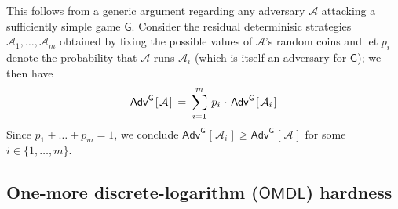 \documentclass{iacrtrans}
\begin{document}
\begin{rem}
\noindent
This follows from a generic argument
regarding any adversary $\mathcal{A}$
attacking a sufficiently simple game $\mathsf{G}$.
Consider the residual determinisic strategies
$\mathcal{A}_1, \dots, \mathcal{A}_m$ obtained
by fixing the possible values of $\mathcal{A}$'s
random coins and let $p_i$ denote the probability that
$\mathcal{A}$ runs $\mathcal{A}_i$
(which is itself an adversary for $\mathsf{G}$);
we then have
\vspace{5pt}
\begin{equation*}
	\mathsf{Adv}
		^{\mathsf{G}}
		\hspace{1pt}
		[
			\hspace{1pt}
			\mathcal{A}
			\hspace{1pt}
		]
	\hspace{2pt}
	=
	\hspace{2pt}
	\sum_{i=1}^m
	\hspace{2pt}
	p_i
	\hspace{1pt}
	\cdot
	\hspace{1pt}
	\mathsf{Adv}
		^{\mathsf{G}}
		\hspace{1pt}
		[
			\hspace{1pt}
			\mathcal{A}_i
			\hspace{1pt}
		]\hspace{1pt}
\vspace{5pt}
\end{equation*}
Since $p_1 + \dots + p_m = 1$, we conclude
$
\mathsf{Adv}
	^{\mathsf{G}}
	\hspace{1pt}
	[
		\hspace{1pt}
		\mathcal{A}_i
		\hspace{1pt}
	]
\ge
\mathsf{Adv}
	^{\mathsf{G}}
	\hspace{1pt}
	[
		\hspace{1pt}
		\mathcal{A}
		\hspace{1pt}
	]
$
for some $i \in \{1, \dots, m\}$.
\end{rem}

\subsection{One-more discrete-logarithm ($\mathsf{OMDL}$) hardness}\label{section_omdl_hardness}
\end{document}
